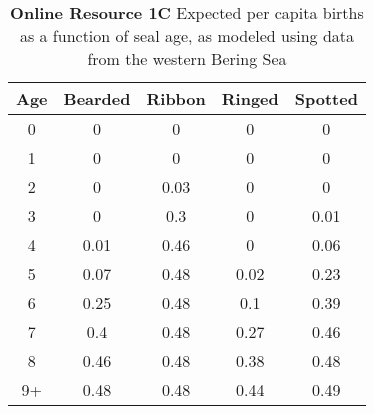 \documentclass{svjour3}
\begin{document}
\begin{table}[htbp]
  \centering
  \caption{\textbf{Online Resource 1C} Expected per capita births as a function of seal age, as modeled using data from the western Bering Sea \citep{Fedoseev2000}}
    \begin{tabular}{p{4.215em}cccc}
    \toprule
    \toprule
    \textbf{Age} & \multicolumn{1}{p{4.215em}}{\textbf{Bearded}} & \multicolumn{1}{p{4.215em}}{\textbf{Ribbon}} & \multicolumn{1}{p{4.215em}}{\textbf{Ringed}} & \multicolumn{1}{p{4.215em}}{\textbf{Spotted}} \\
    \midrule
    \multicolumn{1}{c}{0} & 0     & 0     & 0     & 0 \\
    \multicolumn{1}{c}{1} & 0     & 0     & 0     & 0 \\
    \multicolumn{1}{c}{2} & 0     & 0.03  & 0     & 0 \\
    \multicolumn{1}{c}{3} & 0     & 0.3   & 0     & 0.01 \\
    \multicolumn{1}{c}{4} & 0.01  & 0.46  & 0     & 0.06 \\
    \multicolumn{1}{c}{5} & 0.07  & 0.48  & 0.02  & 0.23 \\
    \multicolumn{1}{c}{6} & 0.25  & 0.48  & 0.1   & 0.39 \\
    \multicolumn{1}{c}{7} & 0.4   & 0.48  & 0.27  & 0.46 \\
    \multicolumn{1}{c}{8} & 0.46  & 0.48  & 0.38  & 0.48 \\
    \multicolumn{1}{c}{9+}    & 0.48  & 0.48  & 0.44  & 0.49 \\
    \bottomrule
    \end{tabular}%
  \label{tab:addlabel}%
\end{table}%
\end{document}
